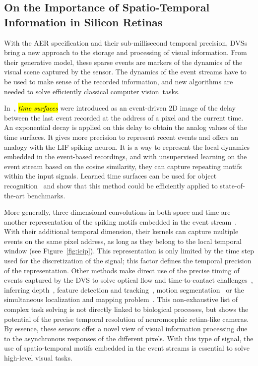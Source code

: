 \documentclass[brainsci, %
               review,accept,pdftex,moreauthors
               ]{Definitions/mdpi}
\begin{document}
\subsection{On the Importance of Spatio-Temporal Information in Silicon Retinas}
%
With the AER specification and their sub-millisecond temporal precision, DVSs bring a new approach to the storage and processing of visual information. From their generative model, these sparse events are markers of the dynamics of the visual scene captured by the sensor. The dynamics of the event streams have to be used to make sense of the recorded information, and new algorithms are needed to solve efficiently classical computer vision~tasks. 

In~\citep{lagorce_hots_2017}, \textit{\hl{time surfaces}} were introduced as an event-driven 2D image of the delay between the last event recorded at the address of a pixel and the current time. An exponential decay is applied on this delay to obtain the analog values of the time surfaces. It gives more precision to represent recent events and offers an analogy with the LIF spiking neuron. It is a way to represent the local dynamics embedded in the event-based recordings, and with unsupervised learning on the event stream based on the cosine similarity, they can capture repeating motifs within the input signals. Learned time surfaces can be used for object recognition~\citep{lagorce_hots_2017, sironi_hats_2018, maro_event-based_2020, grimaldi_homeostatic_2021,grimaldi_robust_2022} and show that this method could be efficiently applied to state-of-the-art benchmarks.

More generally, three-dimensional convolutions in both space and time are another representation of the spiking motifs embedded in the event stream~\citep{ghosh_spatiotemporal_2019, grimaldi_learning_2022, yu_stsc-snn_2022}. With their additional temporal dimension, their kernels can capture multiple events on the same pixel address, as long as they belong to the local temporal window (see Figure~\ref{fig:icip}). This representation is only limited by the time step used for the discretization of the signal; this factor defines the temporal precision of the representation. Other methods make direct use of the precise timing of events captured by the DVS to solve optical flow and time-to-contact challenges~\citep{benosman_event-based_2014, clady_asynchronous_2014, tschechne_bio-inspired_2014}, inferring depth~\citep{hidalgo-carrio_learning_2020}, feature detection and tracking~\citep{dardelet_event-by-event_2021}, motion segmentation~\citep{stoffregen_event-based_2019} or the simultaneous localization and mapping problem~\citep{kim_real-time_2016}. This non-exhaustive list of complex task solving is not directly linked to biological processes, but shows the potential of the precise temporal resolution of neuromorphic retina-like cameras. By essence, these sensors offer a novel view of visual information processing due to the asynchronous responses of the different pixels. With this type of signal, the use of spatio-temporal motifs embedded in the event streams is essential to solve high-level visual tasks. 
\end{document}
